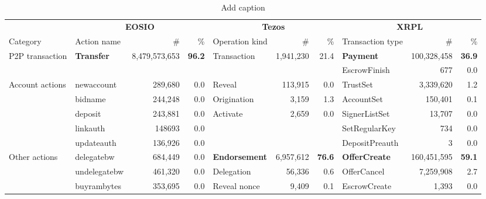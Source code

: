 \begin{table}[htbp]
  \centering
  \caption{Add caption}
    \begin{tabular}{llrrlrrlrr}
    \toprule
      & \multicolumn{3}{c}{\textbf{EOSIO}} & \multicolumn{3}{c}{\textbf{Tezos}} & \multicolumn{3}{c}{\textbf{ XRPL }} \\
    Category & Action name & \# & \% & Operation kind & \# & \% & Transaction type &  \#  & \% \\
    \cmidrule(r){1-1} \cmidrule(rl){2-4} \cmidrule(rl){5-7} \cmidrule(l){8-10}
    P2P transaction & \textbf{Transfer} &    8,479,573,653  & \textbf{             96.2 } & Transaction &    1,941,230  &      21.4  & \textbf{Payment} &    100,328,458  & \textbf{     36.9} \\
      &   &   &   &   &   &   & EscrowFinish &                    677  &         0.0  \\
    \cmidrule(r){1-1} \cmidrule(rl){2-4} \cmidrule(rl){5-7} \cmidrule(l){8-10}
    Account actions & newaccount &                289,680  &                0.0  & Reveal &        113,915  &         0.0  & TrustSet &         3,339,620  &         1.2  \\
      & bidname &                244,248  &                0.0  & Origination &            3,159  &         1.3  & AccountSet &            150,401  &         0.1  \\
      & deposit &                243,881  &                0.0  & Activate &            2,659  &         0.0  & SignerListSet &              13,707  &         0.0  \\
      & linkauth & 148693 & 0.0 &   &   &   & SetRegularKey &                    734  &         0.0  \\
      & updateauth &                136,926  &                0.0  &   &   &   & DepositPreauth &                         3  &         0.0  \\
    \cmidrule(r){1-1} \cmidrule(rl){2-4} \cmidrule(rl){5-7} \cmidrule(l){8-10}
    Other actions & delegatebw &                684,449  &                0.0  & \textbf{Endorsement} &    6,957,612  & \textbf{     76.6 } & \textbf{OfferCreate} &    160,451,595  & \textbf{     59.1 } \\
      & undelegatebw &                461,320  &                0.0  & Delegation &          56,336  &         0.6  & OfferCancel &         7,259,908  &         2.7  \\
      & buyrambytes &                353,695  &                0.0  & Reveal nonce &            9,409  &         0.1  & EscrowCreate &                 1,393  &         0.0  \\

\end{tabular}
\end{table}
